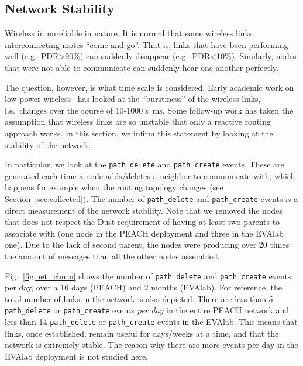 \documentclass{elsarticle}
\newcommand{\pathcreate}          {{\tt path\_create}\xspace}
\newcommand{\pathdelete}          {{\tt path\_delete}\xspace}
\begin{document}
\subsection{Network Stability}
\label{sec:net_stability}


Wireless in unreliable in nature.
It is normal that some wireless links interconnecting motes ``come and go''.
That is, links that have been performing well (e.g.~PDR>90\%) can suddenly disappear (e.g.~PDR<10\%).
Similarly, nodes that were not able to communicate can suddenly hear one another perfectly.


The question, however, is what time scale is considered.
Early academic work on low-power wireless~\cite{srinivasan08beta} has looked at the ``burstiness'' of the wireless links, i.e.~changes over the course of 10-1000's~ms.
Some follow-up work has taken the assumption that wireless links are so unstable that only a reactive routing approach works.
In this section, we infirm this statement by looking at the stability of the network.


In particular, we look at the \pathdelete and \pathcreate events.
These are generated each time a node adds/deletes a neighbor to communicate with, which happens for example when the routing topology changes (see Section~\ref{sec:collected}).
The number of \pathdelete and \pathcreate events is a direct measurement of the network stability.
Note that we removed the nodes that does not respect the Dust requirement of having at least two parents to associate with (one node in the PEACH deployment and three in the EVAlab one).
Due to the lack of second parent, the nodes were producing over 20 times the amount of messages than all the other nodes assembled.


Fig.~\ref{fig:net_churn} shows the number of \pathdelete and \pathcreate events per day, over a 16 days (PEACH) and 2 months (EVAlab).
For reference, the total number of links in the network is also depicted.
There are less than 5 \pathdelete or \pathcreate events \textit{per day} in the entire PEACH network and less than 14  \pathdelete or \pathcreate events in the EVAlab. 
This means that links, once established, remain useful for days/weeks at a time, and that the network is extremely stable.
The reason why there are more events per day in the EVAlab deployment is not studied here.
\end{document}
